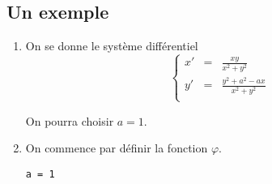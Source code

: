 \subsection{Un exemple}
\begin{enumerate}
\item On se donne le système différentiel 
\[\left\{\begin{matrix}x'&=&\frac{xy}{x^2 + y^2}\\ y' &=& \frac{y^2 +a^2 - ax}{x^2 + y^2}\\
\end{matrix}\right.\]

On pourra choisir $a= 1$. 
\item On commence par définir la fonction $\varphi$.

\begin{lstlisting}
a = 1


\end{lstlisting}
\end{enumerate}
